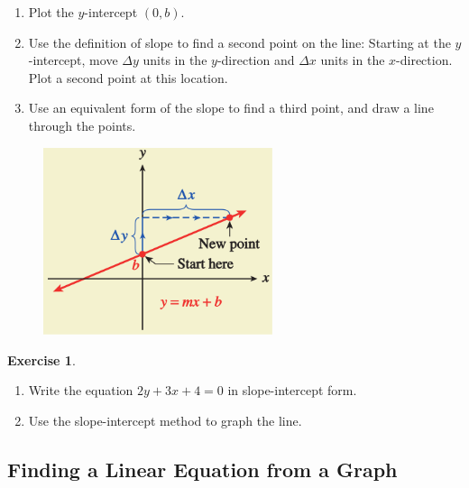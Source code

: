 \documentclass[10pt,]{book}
\theoremstyle{plain}
\theoremstyle{definition}
\newtheorem{exercise}[theorem]{Exercise}
\theoremstyle{definition}
\numberwithin{equation}{section}
\begin{document}
\leavevmode%
\begin{enumerate}[label=*\alph**]
\item\hypertarget{li-166}{}Plot the \(y\)-intercept \((0, b)\).\item\hypertarget{li-167}{}Use the definition of slope to find a second point on the line: Starting at the \(y\)-intercept, move \(\Delta y\) units in the \(y\)-direction and \(\Delta x\) units in the \(x\)-direction. Plot a second point at this location.\item\hypertarget{li-168}{}Use an equivalent form of the slope to find a third point, and draw a line through the points.\end{enumerate}
%
\leavevmode%
\begin{figure}
\centering
\includegraphics[width=0.60\textwidth,]{images/fig-slope-intercept0.svg}\caption{\label{fig-slope-intercept0}}
\end{figure}
\begin{exercise}\label{exercise-slope-intercept}
\leavevmode%
\begin{enumerate}[label=*\alph**]
\item\hypertarget{li-169}{}Write the equation \(2y + 3x + 4 = 0\) in slope-intercept form.\item\hypertarget{li-170}{}Use the slope-intercept method to graph the line.\end{enumerate}
\end{exercise}
\typeout{************************************************}
\typeout{************************************************}
\subsection[Finding a Linear Equation from a Graph]{Finding a Linear Equation from a Graph}\label{subsection-26}
\end{document}
